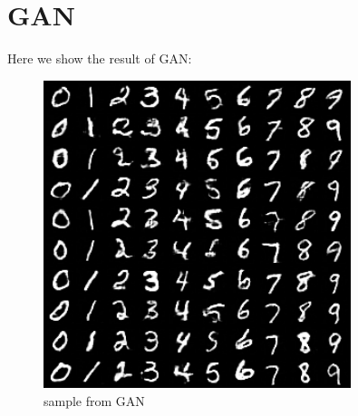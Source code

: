 \documentclass[a4 paper,12pt]{article}
\theoremstyle{definitionstyle}
\begin{document}
\section*{GAN}
Here we show the result of GAN:
\begin{figure}[H]
    \centering
    \includegraphics[width=0.8\textwidth]{gan/sample.png}
    \caption{sample from GAN}
    \label{gan}
\end{figure}
\end{document}
